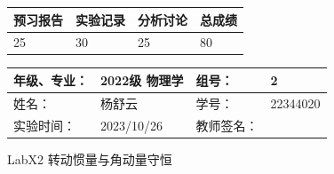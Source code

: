 \documentclass[dvipsnames, svgnames,a4paper,11pt]{article}
\begin{document}
	
	
	
	\begin{table}
		\renewcommand\arraystretch{1.7}
		\begin{tabularx}{\textwidth}{
				|X|X|X|X
				|X|X|X|X|}
			\hline
			\multicolumn{2}{|c|}{预习报告}&\multicolumn{2}{|c|}{实验记录}&\multicolumn{2}{|c|}{分析讨论}&\multicolumn{2}{|c|}{总成绩}\\
			\hline
			\LARGE25 & & \LARGE30 & & \LARGE25 & & \LARGE80 & \\
			\hline
		\end{tabularx}
	\end{table}
	
	\begin{table}
		\renewcommand\arraystretch{1.7}
		\begin{tabularx}{\textwidth}{|X|X|X|X|}
			\hline
			年级、专业： & 2022级 物理学 &组号： & 2\\
			\hline
			姓名： & 杨舒云  & 学号： & 22344020\\
			\hline
			实验时间： & 2023/10/26 & 教师签名： & \\
			\hline
		\end{tabularx}
	\end{table}
	
	\begin{center}
		\LARGE LabX2 \quad 转动惯量与角动量守恒
	\end{center}
	
\end{document}
